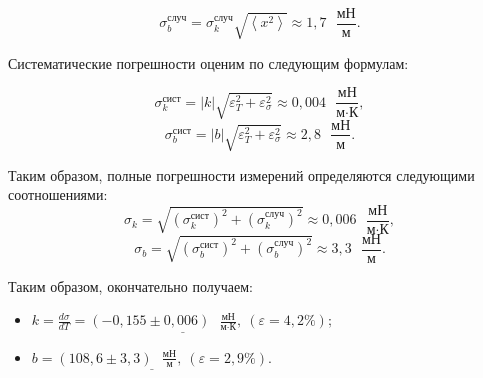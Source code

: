 \documentclass[a4paper,12pt]{article} %
\begin{document}
\[ \sigma^\text{случ}_b=\sigma^\text{случ}_k\sqrt{\left\langle x^2 \right\rangle} \approx 1,7\text{ } \frac{\text{мН}}{\text{м}}. \]

Систематические погрешности оценим по следующим формулам:

\[ \sigma^\text{сист}_k = |k|\sqrt{\varepsilon^2_T+\varepsilon^2_\sigma} \approx 0,004 \text{ } \frac{\text{мН}}{\text{м}\cdot\text{К}}, \]
\[ \sigma^\text{сист}_b = |b|\sqrt{\varepsilon^2_T+\varepsilon^2_\sigma} \approx 2,8 \text{ } \frac{\text{мН}}{\text{м}}. \]

\newpage

Таким образом, полные погрешности измерений определяются следующими соотношениями:
\[ \sigma_k = \sqrt{(\sigma_k^\text{сист})^2 + (\sigma_k^\text{случ})^2} \approx 0,006 \text{ } \frac{\text{мН}}{\text{м}\cdot\text{К}},\]
\[ \sigma_b = \sqrt{(\sigma_b^\text{сист})^2 + (\sigma_b^\text{случ})^2} \approx 3,3 \text{ } \frac{\text{мН}}{\text{м}}. \]

Таким образом, окончательно получаем:
\begin{itemize}
	\item $ \displaystyle \underline{k = \frac{d\sigma}{dT} = (-0,155 \pm 0,006) \text{ } \frac{\text{мН}}{\text{м}\cdot\text{К}}, \: (\varepsilon = 4,2\%);} $
	\item $ \displaystyle \underline{b = (108,6 \pm 3,3) \text{ } \frac{\text{мН}}{\text{м}}, \: (\varepsilon = 2,9\%).}$
\end{itemize}
\end{document}
